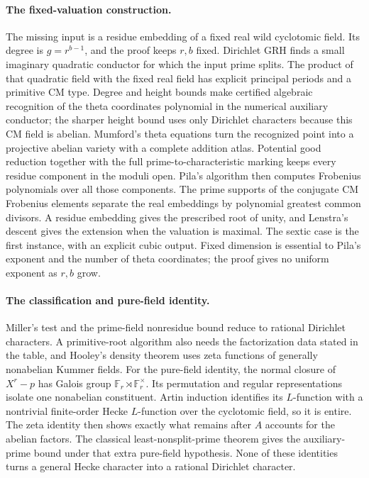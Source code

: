 \documentclass[11pt]{article}
\theoremstyle{definition}
\theoremstyle{remark}
\begin{document}
\paragraph{The fixed-valuation construction.}
The missing input is a residue embedding of a fixed real wild
cyclotomic field. Its degree is \(g=r^{b-1}\), and the proof keeps
\(r,b\) fixed. Dirichlet GRH finds a small imaginary quadratic
conductor for which the input prime splits. The product of that
quadratic field with the fixed real field has explicit principal
periods and a primitive CM type. Degree and height bounds make
certified algebraic recognition of the theta coordinates polynomial
in the numerical auxiliary conductor; the sharper height bound uses
only Dirichlet characters because this CM field is abelian.
Mumford's theta equations turn the recognized point into a projective
abelian variety with a complete addition atlas. Potential good
reduction together with the full prime-to-characteristic marking
keeps every residue component in the moduli open.
Pila's algorithm then computes Frobenius polynomials over all those
components. The prime supports of the conjugate CM Frobenius elements
separate the real embeddings by polynomial greatest common divisors.
A residue embedding gives the prescribed root of unity, and Lenstra's
descent gives the extension when the valuation is maximal. The
sextic case is the first instance, with an explicit cubic output.
Fixed dimension is essential to Pila's exponent and the number of
theta coordinates; the proof gives no uniform exponent as \(r,b\)
grow.

\paragraph{The classification and pure-field identity.}
Miller's test and the prime-field nonresidue bound reduce to rational
Dirichlet characters. A primitive-root algorithm also needs the
factorization data stated in the table, and Hooley's density theorem
uses zeta functions of generally nonabelian Kummer fields.
For the pure-field identity, the normal closure of \(X^r-p\) has
Galois group \(\mathbb F_r\rtimes\mathbb F_r^\times\).
Its permutation and regular representations isolate one nonabelian
constituent. Artin induction identifies its \(L\)-function with a
nontrivial finite-order Hecke \(L\)-function over the cyclotomic
field, so it is entire. The zeta identity then shows exactly what
remains after \(A\) accounts for the abelian factors. The classical
least-nonsplit-prime theorem gives the auxiliary-prime bound under
that extra pure-field hypothesis. None of these identities turns a
general Hecke character into a rational Dirichlet character.
\end{document}
